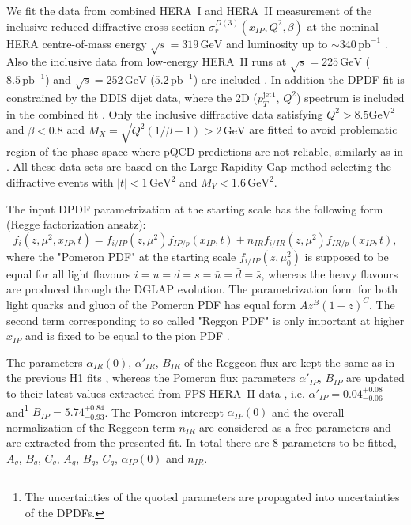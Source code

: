 \documentclass{PoS}
\newcommand{\IP}{I\!\!P}
\newcommand{\IR}{I\!\!R}
\newcommand{\xpom}{x_{\IP}}
\newcommand{\GeV}{\ensuremath{\mathrm{GeV}}\xspace}
\newcommand{\GeVsq}{\ensuremath{\mathrm{GeV}^2}\xspace}
\begin{document}
We fit the data from combined HERA~I and HERA~II measurement of the inclusive reduced diffractive cross section $\sigma_r^{D(3)}(\xpom, Q^2, \beta)$  at the nominal HERA centre-of-mass energy $\sqrt{s} = 319\,\GeV$ and luminosity up to $\sim\!\! 340\,\text{pb}^{-1}$  \cite{Aaron:2012ad}.
Also the inclusive data from low-energy HERA~II runs at $\sqrt{s} = 225\,\GeV$ ($8.5\,\text{pb}^{-1}$) and $\sqrt{s} = 252\,\GeV$ ($5.2\,\text{pb}^{-1}$) are included \cite{Aaron:2012zz}.
In addition the DPDF fit is constrained by the DDIS dijet data, where the 2D ($p_T^{\mathrm{jet}1}$, $Q^2$) spectrum is included in the combined fit \cite{Andreev:2014yra}.
Only the inclusive diffractive data satisfying $Q^2 > 8.5 \GeVsq$ and $\beta < 0.8$ and $M_X = \sqrt{Q^2(1/\beta - 1)} > 2\,\GeV$ are fitted to avoid problematic region of the phase space where pQCD predictions are not reliable, similarly as in \cite{Aktas:2006hy}.
All these data sets are based on the Large Rapidity Gap method selecting the diffractive events with $|t| < 1\,\GeVsq$ and $M_Y < 1.6\,\GeVsq$.


The input DPDF parametrization at the starting scale has the following form (Regge factorization ansatz):
\begin{equation}
f_i (z, \mu^2, \xpom, t) = f_{i/\IP} (z, \mu^2) f_{\IP/p} (\xpom, t) + n_{\IR} f_{i/\IR} (z, \mu^2) f_{\IR/p} (\xpom, t),
\end{equation}
where the "Pomeron PDF" at the starting scale  $f_{i/\IP}(z, \mu_0^2)$ is supposed to be equal for all light flavours $i=u=d=s = \bar{u} = \bar{d} = \bar{s}$, whereas the heavy flavours are produced through the DGLAP evolution.
The parametrization form for both light quarks and gluon of the Pomeron PDF has equal form $A z^B (1-z)^C$.
The second term corresponding to so called "Reggon PDF" is only important at higher $\xpom$ and is fixed to be equal to the pion PDF \cite{Owens:1984zj}.

The parameters  $\alpha_{\IR}(0)$,  $\alpha'_{\IR}$, $B_{\IR}$   of the Reggeon flux are kept the same as in the previous H1 fits \cite{Aktas:2006hy,Aktas:2007bv}, whereas the Pomeron flux parameters $\alpha'_{\IP}$, $B_{\IP}$ are updated to their latest values extracted from FPS HERA~II data \cite{Aaron:2010aa}, i.e. $\alpha'_{\IP} = 0.04^{+0.08}_{-0.06}$ and\footnote{The uncertainties of the quoted parameters are propagated into uncertainties of the DPDFs.} $B_{\IP} = 5.74^{+0.84}_{-0.93}$.
The Pomeron intercept $\alpha_{\IP}(0)$ and the overall normalization of the Reggeon term $n_{\IR}$ are considered as a free parameters and are extracted from the presented fit.
In total there are 8 parameters to be fitted, $A_q$, $B_q$, $C_q$, $A_g$, $B_g$, $C_g$, $\alpha_{\IP}(0)$ and $n_{\IR}$.
\end{document}
